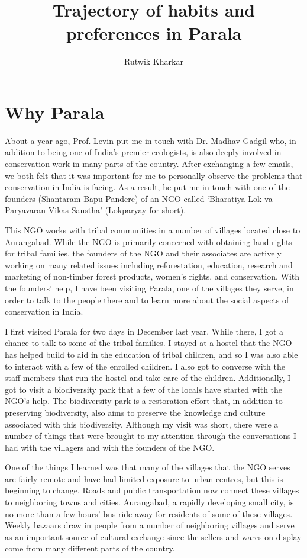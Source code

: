 \documentclass{report}
\title{Trajectory of habits and preferences in Parala}
\author{Rutwik Kharkar}
\begin{document}
\maketitle

\chapter*{Why Parala}\label{ch:wh_par}

About a year ago, Prof. Levin put me in touch with Dr. Madhav Gadgil who, in addition to being one of India's premier ecologists, is also deeply involved in conservation work in many parts of the country. After exchanging a few emails, we both felt that it was important for me to personally observe the problems that conservation in India is facing. As a result, he put me in touch with one of the founders (Shantaram Bapu Pandere) of an NGO called `Bharatiya Lok va Paryavaran Vikas Sanstha' (Lokparyay for short).

This NGO works with tribal communities in a number of villages located close to Aurangabad. While the NGO is primarily concerned with obtaining land rights for tribal families, the founders of the NGO and their associates are actively working on many related issues including reforestation, education, research and marketing of non-timber forest products, women's rights, and conservation. With the founders' help, I have been visiting Parala, one of the villages they serve, in order to talk to the people there and to learn more about the social aspects of conservation in India.

I first visited Parala for two days in December last year. While there, I got a chance to talk to some of the tribal families. I stayed at a hostel that the NGO has helped build to aid in the education of tribal children, and so I was also able to interact with a few of the enrolled children. I also got to converse with the staff members that run the hostel and take care of the children. Additionally, I got to visit a biodiversity park that a few of the locals have started with the NGO's help. The biodiversity park is a restoration effort that, in addition to preserving biodiversity, also aims to preserve the knowledge and culture associated with this biodiversity. Although my visit was short, there were a number of things that were brought to my attention through the conversations I had with the villagers and with the founders of the NGO.

One of the things I learned was that many of the villages that the NGO serves are fairly remote and have had limited exposure to urban centres, but this is beginning to change. Roads and public transportation now connect these villages to neighboring towns and cities. Aurangabad, a rapidly developing small city, is no more than a few hours' bus ride away for residents of some of these villages. Weekly bazaars draw in people from a number of neighboring villages and serve as an important source of cultural exchange since the sellers and wares on display come from many different parts of the country.
\end{document}
